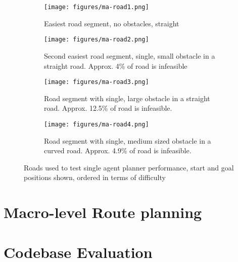 \begin{figure}
  \centering
  \begin{subfigure}[b]{0.44\textwidth}
    \centering
    \texttt{[image: figures/ma-road1.png]}
    \caption{\label{subfig:ma-road1}Easiest road segment, no obstacles, straight}
  \end{subfigure}
  \begin{subfigure}[b]{0.44\textwidth}
    \centering
    \texttt{[image: figures/ma-road2.png]}
    \caption{\label{subfig:ma-road2}Second easiest road segment, single, small obstacle in a straight road. Approx. 4\% of road is infeasible}
  \end{subfigure}
  \begin{subfigure}[b]{0.44\textwidth}
    \centering
    \texttt{[image: figures/ma-road3.png]}
    \caption{\label{subfig:ma-road3}Road segment with single, large obstacle in a straight road. Approx. 12.5\% of road is infeasible.}
  \end{subfigure}
  \begin{subfigure}[b]{0.44\textwidth}
    \centering
    \texttt{[image: figures/ma-road4.png]}
    \caption{\label{subfig:ma-road4}Road segment with single, medium sized obstacle in a curved road. Approx. 4.9\% of road is infeasible.}
  \end{subfigure}
  \caption{\label{fig:multi-agent-roads} Roads used to test single agent planner performance, start and goal positions shown, ordered in terms of difficulty}
\end{figure}


\section{Macro-level Route planning}

\section{Codebase Evaluation}


